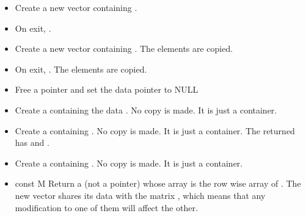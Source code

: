 \begin{itemize}
\item {}
  \sshortdescribe Create a new vector containing .

\item {}
  \sshortdescribe On exit, .

\item {}
  \sshortdescribe Create a new vector containing . The
  elements are copied.
  
\item {}
  \sshortdescribe On exit, .  The
  elements are copied.

\item {}
  \sshortdescribe Free a  pointer and set the data pointer to NULL  
\item {}
    \sshortdescribe Create a  containing the data 
  . No copy is made. It is just a container.
  
\item {}
  \sshortdescribe Create a  containing
  . No copy is made. It is just a container. The returned
   has  and .

\item {}
  \sshortdescribe Create a  containing . No
  copy is made. It is just a container.

\item {}
  {const  \ptr M}
  \sshortdescribe Return a  (not a pointer) whose array is
  the row wise array of . The new vector shares its data with the
  matrix , which means that any modification to one of them will affect
  the other.
\end{itemize}


